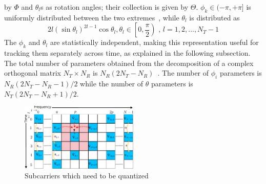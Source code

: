 \documentclass[conference]{IEEEtran}
\begin{document}
by $\Phi$ and $\theta_{l}$s as rotation angles; their collection is
given by $\Theta$. $\phi_k \in (-\pi, + \pi]$ is uniformly distributed
between the two extremes~\cite{4114278}, while $\theta_l$ is
distributed as
\begin{equation}
2l(\sin\theta_l)^{2l-1}\cos\theta_l, \theta_l \in \left[0, \frac{\pi}{2}\right) \mbox{ , } l = 1,2,\ldots,N_T -1
\end{equation}
The $\phi_k$ and $\theta_l$ are statistically independent, making this
representation useful for tracking them separately across time, as
explained in the following subsection. The total number of parameters
obtained from the decomposition of a complex orthogonal matrix
$N_{T} \times N_{R} $ is $N_{R}(2N_{T} - N_{R})$~\cite{4114278}. The
number of $\phi_i$ parameters is $N_{R}(2N_{T} - N_{R}-1)/2$ while the
number of $\theta$ parameters is $N_{T}(2N_{T} - N_{R}+1)/2$.
\begin{figure}
\includegraphics[width=0.5\textwidth]{images/new-adpm.pdf}
\caption{\label{fig:adpm-fig}Subcarriers which need to be quantized}
\label{ber_overvie}
\vspace{-5pt}
\end{figure}
\end{document}
